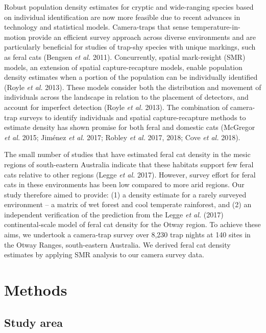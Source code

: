 \documentclass[11pt,a4paper,titlepage,twoside,openright]{style/unimelbthesis}
\begin{document}
\begin{mainmatter}
Robust population density estimates for cryptic and wide-ranging species based on individual identification are now more feasible due to recent advances in technology and statistical models. Camera-traps that sense temperature-in-motion provide an efficient survey approach across diverse environments and are particularly beneficial for studies of trap-shy species with unique markings, such as feral cats (Bengsen \emph{et al.} 2011). Concurrently, spatial mark-resight (SMR) models, an extension of spatial capture-recapture models, enable population density estimates when a portion of the population can be individually identified (Royle \emph{et al.} 2013). These models consider both the distribution and movement of individuals across the landscape in relation to the placement of detectors, and account for imperfect detection (Royle \emph{et al.} 2013). The combination of camera-trap surveys to identify individuals and spatial capture-recapture methods to estimate density has shown promise for both feral and domestic cats (McGregor \emph{et al.} 2015; Jiménez \emph{et al.} 2017; Robley \emph{et al.} 2017, 2018; Cove \emph{et al.} 2018).

The small number of studies that have estimated feral cat density in the mesic regions of south-eastern Australia indicate that these habitats support few feral cats relative to other regions (Legge \emph{et al.} 2017). However, survey effort for feral cats in these environments has been low compared to more arid regions. Our study therefore aimed to provide: (1) a density estimate for a rarely surveyed environment -- a matrix of wet forest and cool temperate rainforest, and (2) an independent verification of the prediction from the Legge \emph{et al.} (2017) continental-scale model of feral cat density for the Otway region. To achieve these aims, we undertook a camera-trap survey over 8,230 trap nights at 140 sites in the Otway Ranges, south-eastern Australia. We derived feral cat density estimates by applying SMR analysis to our camera survey data.

\newpage

\hypertarget{methods-2}{%
\section{Methods}\label{methods-2}}

\hypertarget{study-area-2}{%
\subsection{Study area}\label{study-area-2}}


\end{mainmatter}
\end{document}
